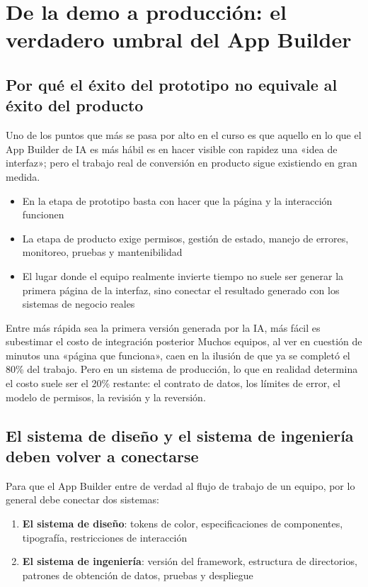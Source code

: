 \section{De la demo a producción: el verdadero umbral del App Builder}

\subsection{Por qué el éxito del prototipo no equivale al éxito del producto}

Uno de los puntos que más se pasa por alto en el curso es que aquello en lo que el App Builder de IA es más hábil es en hacer visible con rapidez una «idea de interfaz»; pero el trabajo real de conversión en producto sigue existiendo en gran medida.

\begin{itemize}
    \item En la etapa de prototipo basta con hacer que la página y la interacción funcionen
    \item La etapa de producto exige permisos, gestión de estado, manejo de errores, monitoreo, pruebas y mantenibilidad
    \item El lugar donde el equipo realmente invierte tiempo no suele ser generar la primera página de la interfaz, sino conectar el resultado generado con los sistemas de negocio reales
\end{itemize}

\begin{warningbox}{Entre más rápida sea la primera versión generada por la IA, más fácil es subestimar el costo de integración posterior}
Muchos equipos, al ver en cuestión de minutos una «página que funciona», caen en la ilusión de que ya se completó el 80\% del trabajo. Pero en un sistema de producción, lo que en realidad determina el costo suele ser el 20\% restante: el contrato de datos, los límites de error, el modelo de permisos, la revisión y la reversión.
\end{warningbox}

\subsection{El sistema de diseño y el sistema de ingeniería deben volver a conectarse}

Para que el App Builder entre de verdad al flujo de trabajo de un equipo, por lo general debe conectar dos sistemas:

\begin{enumerate}
    \item \textbf{El sistema de diseño}: tokens de color, especificaciones de componentes, tipografía, restricciones de interacción
    \item \textbf{El sistema de ingeniería}: versión del framework, estructura de directorios, patrones de obtención de datos, pruebas y despliegue
\end{enumerate}

